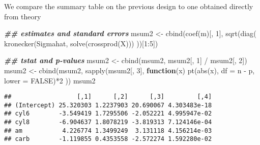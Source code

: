 \documentclass[
  ignorenonframetext,
]{beamer}
\newenvironment{Shaded}{\begin{snugshade}}{\end{snugshade}}
\newcommand{\AttributeTok}[1]{\textcolor[rgb]{0.77,0.63,0.00}{#1}}
\newcommand{\ConstantTok}[1]{\textcolor[rgb]{0.00,0.00,0.00}{#1}}
\newcommand{\ControlFlowTok}[1]{\textcolor[rgb]{0.13,0.29,0.53}{\textbf{#1}}}
\newcommand{\DecValTok}[1]{\textcolor[rgb]{0.00,0.00,0.81}{#1}}
\newcommand{\DocumentationTok}[1]{\textcolor[rgb]{0.56,0.35,0.01}{\textbf{\textit{#1}}}}
\newcommand{\FunctionTok}[1]{\textcolor[rgb]{0.00,0.00,0.00}{#1}}
\newcommand{\NormalTok}[1]{#1}
\newcommand{\OtherTok}[1]{\textcolor[rgb]{0.56,0.35,0.01}{#1}}
\newcommand{\SpecialCharTok}[1]{\textcolor[rgb]{0.00,0.00,0.00}{#1}}
\begin{document}
\begin{frame}[fragile]{}
\protect\hypertarget{section-4}{}
We compare the summary table on the previous design to one obtained
directly from theory

\vspace{12pt}
\tiny

\begin{Shaded}
\begin{Highlighting}[]
\DocumentationTok{\#\# estimates and standard errors}
\NormalTok{msum2 }\OtherTok{\textless{}{-}} \FunctionTok{cbind}\NormalTok{(}\FunctionTok{coef}\NormalTok{(m)[, }\DecValTok{1}\NormalTok{], }\FunctionTok{sqrt}\NormalTok{(}\FunctionTok{diag}\NormalTok{( }\FunctionTok{kronecker}\NormalTok{(Sigmahat, }\FunctionTok{solve}\NormalTok{(}\FunctionTok{crossprod}\NormalTok{(X))) ))[}\DecValTok{1}\SpecialCharTok{:}\DecValTok{5}\NormalTok{])}

\DocumentationTok{\#\# tstat and p{-}values}
\NormalTok{msum2 }\OtherTok{\textless{}{-}} \FunctionTok{cbind}\NormalTok{(msum2, msum2[, }\DecValTok{1}\NormalTok{] }\SpecialCharTok{/}\NormalTok{ msum2[, }\DecValTok{2}\NormalTok{])}
\NormalTok{msum2 }\OtherTok{\textless{}{-}} \FunctionTok{cbind}\NormalTok{(msum2, }\FunctionTok{sapply}\NormalTok{(msum2[, }\DecValTok{3}\NormalTok{], }\ControlFlowTok{function}\NormalTok{(x) }\FunctionTok{pt}\NormalTok{(}\FunctionTok{abs}\NormalTok{(x), }\AttributeTok{df =}\NormalTok{ n }\SpecialCharTok{{-}}\NormalTok{ p, }\AttributeTok{lower =} \ConstantTok{FALSE}\NormalTok{)}\SpecialCharTok{*}\DecValTok{2}\NormalTok{ ))}
\NormalTok{msum2}
\end{Highlighting}
\end{Shaded}

\begin{verbatim}
##                  [,1]      [,2]      [,3]         [,4]
## (Intercept) 25.320303 1.2237903 20.690067 4.303483e-18
## cyl6        -3.549419 1.7295506 -2.052221 4.995947e-02
## cyl8        -6.904637 1.8078219 -3.819313 7.124146e-04
## am           4.226774 1.3499249  3.131118 4.156214e-03
## carb        -1.119855 0.4353558 -2.572274 1.592280e-02
\end{verbatim}
\end{frame}
\end{document}
